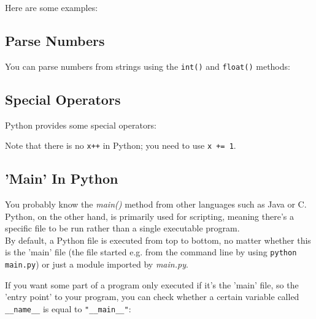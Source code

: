         Here are some examples:


    \subsection{Parse Numbers}
        You can parse numbers from strings using the
        \texttt{int()} and \texttt{float()} methods:


    \subsection{Special Operators}
        Python provides some special operators:


        Note that there is no \texttt{x++} in Python; you need to use
        \texttt{x += 1}.

    \subsection{'Main' In Python}
        You probably know the \textit{main()} method from other languages such as Java or C. \\
        Python, on the other hand, is primarily used for scripting, meaning there's a specific file
        to be run rather than a single executable program. \\
        By default, a Python file is executed from top to bottom, no matter whether this is the
        'main' file (the file started e.g. from the command line by using
        \texttt{python main.py}) or just a module imported by \textit{main.py}.

        If you want some part of a program only executed if it's the 'main' file, so the
        'entry point' to your program, you can check whether a certain variable called
        \texttt{__name__} is equal to \texttt{"__main__"}:


